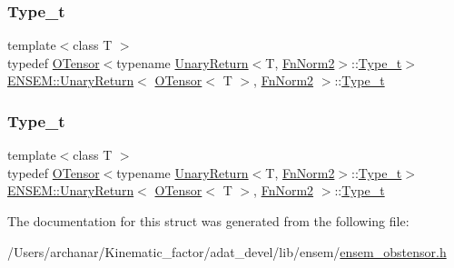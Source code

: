 \subsubsection{\texorpdfstring{Type\_t}{Type\_t}\hspace{0.1cm}{\footnotesize\ttfamily [1/2]}}
{\footnotesize\ttfamily template$<$class T $>$ \\
typedef \mbox{\hyperlink{classENSEM_1_1OTensor}{O\+Tensor}}$<$typename \mbox{\hyperlink{structENSEM_1_1UnaryReturn}{Unary\+Return}}$<$T, \mbox{\hyperlink{structENSEM_1_1FnNorm2}{Fn\+Norm2}}$>$\+::\mbox{\hyperlink{structENSEM_1_1UnaryReturn_3_01OTensor_3_01T_01_4_00_01FnNorm2_01_4_a61af55ec610c7d6312c97907937f00bd}{Type\+\_\+t}}$>$ \mbox{\hyperlink{structENSEM_1_1UnaryReturn}{E\+N\+S\+E\+M\+::\+Unary\+Return}}$<$ \mbox{\hyperlink{classENSEM_1_1OTensor}{O\+Tensor}}$<$ T $>$, \mbox{\hyperlink{structENSEM_1_1FnNorm2}{Fn\+Norm2}} $>$\+::\mbox{\hyperlink{structENSEM_1_1UnaryReturn_3_01OTensor_3_01T_01_4_00_01FnNorm2_01_4_a61af55ec610c7d6312c97907937f00bd}{Type\+\_\+t}}}

\mbox{\label{structENSEM_1_1UnaryReturn_3_01OTensor_3_01T_01_4_00_01FnNorm2_01_4_a61af55ec610c7d6312c97907937f00bd}} 
\subsubsection{\texorpdfstring{Type\_t}{Type\_t}\hspace{0.1cm}{\footnotesize\ttfamily [2/2]}}
{\footnotesize\ttfamily template$<$class T $>$ \\
typedef \mbox{\hyperlink{classENSEM_1_1OTensor}{O\+Tensor}}$<$typename \mbox{\hyperlink{structENSEM_1_1UnaryReturn}{Unary\+Return}}$<$T, \mbox{\hyperlink{structENSEM_1_1FnNorm2}{Fn\+Norm2}}$>$\+::\mbox{\hyperlink{structENSEM_1_1UnaryReturn_3_01OTensor_3_01T_01_4_00_01FnNorm2_01_4_a61af55ec610c7d6312c97907937f00bd}{Type\+\_\+t}}$>$ \mbox{\hyperlink{structENSEM_1_1UnaryReturn}{E\+N\+S\+E\+M\+::\+Unary\+Return}}$<$ \mbox{\hyperlink{classENSEM_1_1OTensor}{O\+Tensor}}$<$ T $>$, \mbox{\hyperlink{structENSEM_1_1FnNorm2}{Fn\+Norm2}} $>$\+::\mbox{\hyperlink{structENSEM_1_1UnaryReturn_3_01OTensor_3_01T_01_4_00_01FnNorm2_01_4_a61af55ec610c7d6312c97907937f00bd}{Type\+\_\+t}}}



The documentation for this struct was generated from the following file\+:\begin{DoxyCompactItemize}
\item 
/\+Users/archanar/\+Kinematic\+\_\+factor/adat\+\_\+devel/lib/ensem/\mbox{\hyperlink{lib_2ensem_2ensem__obstensor_8h}{ensem\+\_\+obstensor.\+h}}\end{DoxyCompactItemize}
